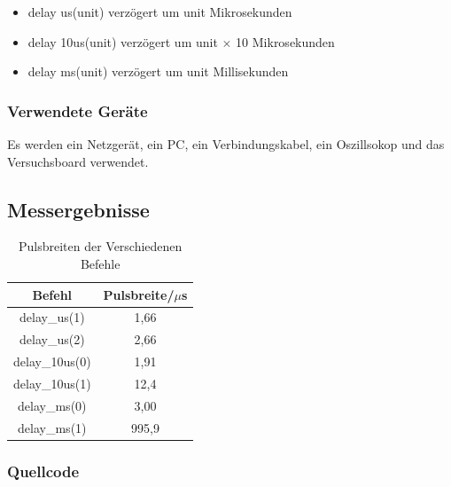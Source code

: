 \documentclass[12pt,a4paper]{article}
\begin{document}
\begin{itemize}
\item	delay us(unit) verzögert um unit Mikrosekunden

\item	delay 10us(unit) verzögert um unit $\times$ 10 Mikrosekunden

\item	delay ms(unit) verzögert um unit Millisekunden
\end{itemize}

\subsubsection*{Verwendete Geräte}

Es werden ein Netzgerät, ein PC, ein Verbindungskabel, ein Oszillsokop und das Versuchsboard verwendet.


\subsection*{Messergebnisse}
\begin{table}[H]
\centering
\begin{tabular}{|c|c|}
	\hline
	    Befehl     & Pulsbreite/$\mu$s \\ \hline\hline
	 delay\_us(1)  &       1,66        \\ \hline
	 delay\_us(2)  &       2,66        \\ \hline
	delay\_10us(0) &       1,91        \\ \hline
	delay\_10us(1) &       12,4        \\ \hline
	 delay\_ms(0)  &       3,00        \\ \hline
	 delay\_ms(1)  &       995,9       \\ \hline
\end{tabular} 
\caption{Pulsbreiten der Verschiedenen Befehle}
\label{tab:puls_1}
\end{table}


\subsubsection*{Quellcode}
\end{document}
